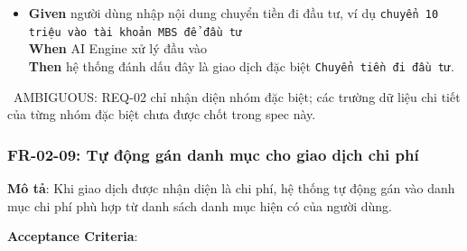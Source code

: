 \begin{itemize}
\item \textbf{Given} người dùng nhập nội dung chuyển tiền đi đầu tư, ví dụ \texttt{chuyển 10 triệu vào tài khoản MBS để đầu tư}  \\ \hspace*{1.5em}  \textbf{When} AI Engine xử lý đầu vào  \\ \hspace*{1.5em}  \textbf{Then} hệ thống đánh dấu đây là giao dịch đặc biệt \texttt{Chuyển tiền đi đầu tư}.
\end{itemize}
\warningicon\  AMBIGUOUS: REQ-02 chỉ nhận diện nhóm đặc biệt; các trường dữ liệu chi tiết của từng nhóm đặc biệt chưa được chốt trong spec này.



\subsubsection{FR-02-09: Tự động gán danh mục cho giao dịch chi phí}

\textbf{Mô tả}: Khi giao dịch được nhận diện là chi phí, hệ thống tự động gán vào danh mục chi phí phù hợp từ danh sách danh mục hiện có của người dùng.



\textbf{Acceptance Criteria}:

